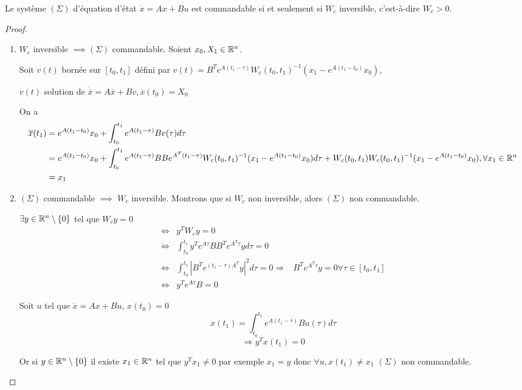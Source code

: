 \documentclass[main.tex]{subfiles}
\begin{document}
\begin{thm}
Le système $(\Sigma)$ d'équation d'état $\dot{x}=Ax+Bu$ est commandable si et seulement si $W_c$ inversible, c'est-à-dire $W_c > 0$.
\end{thm}

\begin{proof}~\\
  \begin{enumerate}[label=\alph*)]

  \item $W_c$ inversible $\implies (\Sigma)$ commandable.
Soient $x_0,X_1\in\mathbb{R}^n$.

Soit $v(t)$ bornée sur $[t_0,t_1]$ défini par $v(t) = B^Te^{A(t_1-\tau)}W_c(t_0,t_1)^{-1}(x_1-e^{A(t_1-t_0)}x_0)$,

$v(t)$ solution de $\dot{\overline{x}} = A\overline{x}+Bv,\overline{x}(t_0) = X_0$

On a \begin{align*}
\overline{x}(t_1) & = e^{A(t_1-t_0)}x_0 + \int_{t_0}^{t_1}e^{A(t_1-\tau)}Bv(\tau)d\tau \\
& = e^{A(t_1-t_0)}x_0 + \int_{t_0}^{t_1}e^{A(t_1-\tau)}BBe^{A^T(t_1-\tau)}W_c(t_0,t_1)^{-1}(x_1-e^{A(t_1-t_0)}x_0)d\tau + W_c(t_0,t_1)W_c(t_0,t_1)^{-1}(x_1-e^{A(t_1-t_0)}x_0), \forall x_1 \in \mathbb{R}^n \\
& = x_1
\end{align*}

\item  $(\Sigma)$ commandable $\implies$  $W_c$ inversible. Montrons que si $W_c$ non inversible, alors $(\Sigma)$ non commandable.

$\exists y \in \mathbb{R}^n \setminus \{0\}$ tel que $W_cy=0$
\begin{align*}
\Leftrightarrow & y^TW_c y = 0 \\
\Leftrightarrow & \int_{t_0}^{t_1}y^T e^{A\tau}BB^Te^{A^T\tau}yd\tau = 0 \\
\Leftrightarrow & \int_{t_0}^{t_1}\left|B^Te^{(t_1-\tau)A^T}y\right|^2d\tau =0
\Rightarrow & B^Te^{A^T\tau}y=0 \forall\tau\in [t_0,t_1] \\
\Leftrightarrow & y^Te^{A\tau}B=0
\end{align*}

Soit $u$ tel que $\dot{x}=Ax+Bu$, $x(t_0)=0$
\[x(t_1) = \int_{t_0}^{t_1}e^{A(t_1-\tau)}Bu(\tau)d\tau \]
\[ \Rightarrow y^Tx(t_1)=0 \]

Or si $y\in\mathbb{R}^n \setminus \{0\}$ il existe $x_1\in\mathbb{R}^n$ tel que $y^Tx_1\neq 0$ par exemple $x_1=y$ donc $\forall u, x(t_1) \neq x_1$ $(\Sigma)$ non commandable.
\end{enumerate}
\end{proof}
\end{document}
